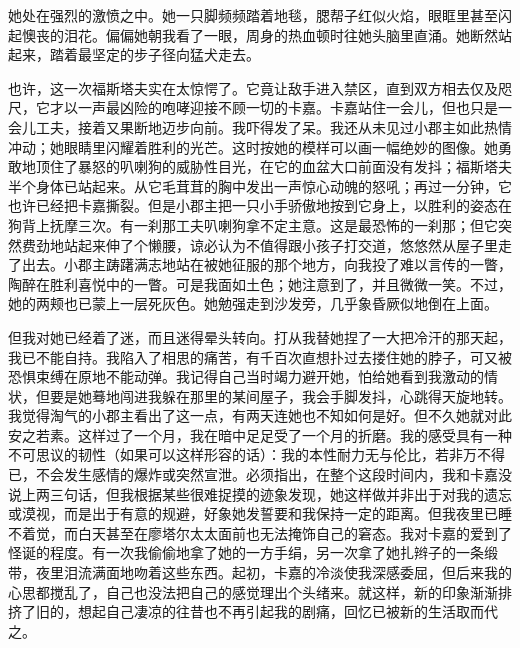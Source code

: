 \documentclass[12pt, UTF8]{ctexbook}
\begin{document}
\par 她处在强烈的激愤之中。她一只脚频频踏着地毯，腮帮子红似火焰，眼眶里甚至闪起懊丧的泪花。偏偏她朝我看了一眼，周身的热血顿时往她头脑里直涌。她断然站起来，踏着最坚定的步子径向猛犬走去。
\par 也许，这一次福斯塔夫实在太惊愕了。它竟让敌手进入禁区，直到双方相去仅及咫尺，它才以一声最凶险的咆哮迎接不顾一切的卡嘉。卡嘉站住一会儿，但也只是一会儿工夫，接着又果断地迈步向前。我吓得发了呆。我还从未见过小郡主如此热情冲动；她眼睛里闪耀着胜利的光芒。这时按她的模样可以画一幅绝妙的图像。她勇敢地顶住了暴怒的叭喇狗的威胁性目光，在它的血盆大口前面没有发抖；福斯塔夫半个身体已站起来。从它毛茸茸的胸中发出一声惊心动魄的怒吼；再过一分钟，它也许已经把卡嘉撕裂。但是小郡主把一只小手骄傲地按到它身上，以胜利的姿态在狗背上抚摩三次。有一刹那工夫叭喇狗拿不定主意。这是最恐怖的一刹那；但它突然费劲地站起来伸了个懒腰，谅必认为不值得跟小孩子打交道，悠悠然从屋子里走了出去。小郡主踌躇满志地站在被她征服的那个地方，向我投了难以言传的一瞥，陶醉在胜利喜悦中的一瞥。可是我面如土色；她注意到了，并且微微一笑。不过，她的两颊也已蒙上一层死灰色。她勉强走到沙发旁，几乎象昏厥似地倒在上面。
\par 但我对她已经着了迷，而且迷得晕头转向。打从我替她捏了一大把冷汗的那天起，我已不能自持。我陷入了相思的痛苦，有千百次直想扑过去搂住她的脖子，可又被恐惧束缚在原地不能动弹。我记得自己当时竭力避开她，怕给她看到我激动的情状，但要是她蓦地闯进我躲在那里的某间屋子，我会手脚发抖，心跳得天旋地转。我觉得淘气的小郡主看出了这一点，有两天连她也不知如何是好。但不久她就对此安之若素。这样过了一个月，我在暗中足足受了一个月的折磨。我的感受具有一种不可思议的韧性（如果可以这样形容的话）：我的本性耐力无与伦比，若非万不得已，不会发生感情的爆炸或突然宣泄。必须指出，在整个这段时间内，我和卡嘉没说上两三句话，但我根据某些很难捉摸的迹象发现，她这样做并非出于对我的遗忘或漠视，而是出于有意的规避，好象她发誓要和我保持一定的距离。但我夜里已睡不着觉，而白天甚至在廖塔尔太太面前也无法掩饰自己的窘态。我对卡嘉的爱到了怪诞的程度。有一次我偷偷地拿了她的一方手绢，另一次拿了她扎辫子的一条缎带，夜里泪流满面地吻着这些东西。起初，卡嘉的冷淡使我深感委屈，但后来我的心思都搅乱了，自己也没法把自己的感觉理出个头绪来。就这样，新的印象渐渐排挤了旧的，想起自己凄凉的往昔也不再引起我的剧痛，回忆已被新的生活取而代之。
\end{document}
